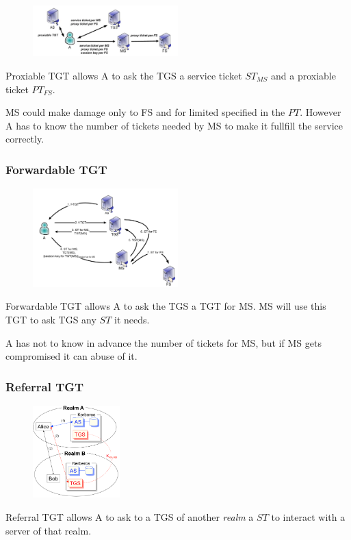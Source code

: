 \documentclass[a4paper,12pt]{article}
\begin{document}
\begin{figure}[H]
  \centering
  \includegraphics[width=0.5\textwidth]{img/proxy}
\end{figure}

Proxiable TGT allows A to ask the TGS a service ticket $ST_{MS}$ and a proxiable ticket $PT_{FS}$.

MS could make damage only to FS and for limited specified in the $PT$. However A has to know the number of tickets needed by MS to make it fullfill the service correctly.

\subsubsection{Forwardable TGT}

\begin{figure}[H]
  \centering
  \includegraphics[width=0.5\textwidth]{img/forward}
\end{figure}

Forwardable TGT allows A to ask the TGS a TGT for MS. MS will use this TGT to ask TGS any $ST$ it needs.

A has not to know in advance the number of tickets for MS, but if MS gets compromised it can abuse of it.

\subsubsection{Referral TGT}

\begin{figure}[H]
  \centering
  \includegraphics[width=0.3\textwidth]{img/realms}
\end{figure}
Referral TGT allows A to ask to a TGS of another \textit{realm} a $ST$ to interact with a server of that realm.
\end{document}
